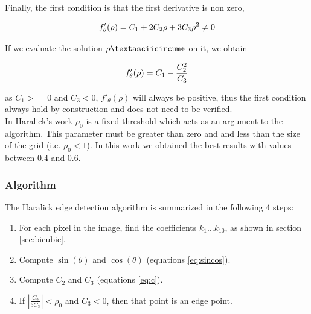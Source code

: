 \documentclass{ipol}
\numberwithin{equation}{section}
\numberwithin{table}{section}
\begin{document}
{Finally,  the first condition is that the first derivative is non zero, 

\begin{equation}\label{eq:cond:first}
f'_{\theta}(\rho) = C_1 + 2C_2\rho + 3C_3\rho^2 \neq 0 \\
\end{equation}

If we evaluate the solution $\rhoˆ*$ on it, we obtain

\begin{equation}\label{eq:cond:first}
f'_{\theta}(\rho) = C_1 - \frac{C_2^2}{C_3}  \\
\end{equation}

as $C_1>=0$ and $C_3<0$, $f'_{\theta}(\rho)$ will always be positive, thus the first condition always hold by construction and does not need to be verified.\\

In Haralick's work $\rho_0$ is a fixed threshold which acts as an argument to the algorithm.
\myn{\label{second_derivative:haralick:analitical:parameter_value}}  This parameter must be greater than zero and and less than the size of the grid (i.e. $\rho_0<1$). In this work we obtained the best results with values between $0.4$ and $0.6$.\\


\subsubsection{Algorithm}

The Haralick edge detection algorithm is summarized in the following 4 steps:

\begin{enumerate}
	\item For each pixel in the image, find the coefficients $k_1 \hdots k_{10}$, as shown in section \ref{sec:bicubic}.
	\item Compute $\sin(\theta)$ and $\cos(\theta)$ (equations \ref{eq:sincos}).
	\item Compute $C_2$ and $C_3$ (equations \ref{eq:c}).
	\item If $\left| \frac{C_2}{3C_3} \right| < \rho_0$ and $C_3 < 0$, then that point is an edge point.
\end{enumerate}


}
\end{document}
